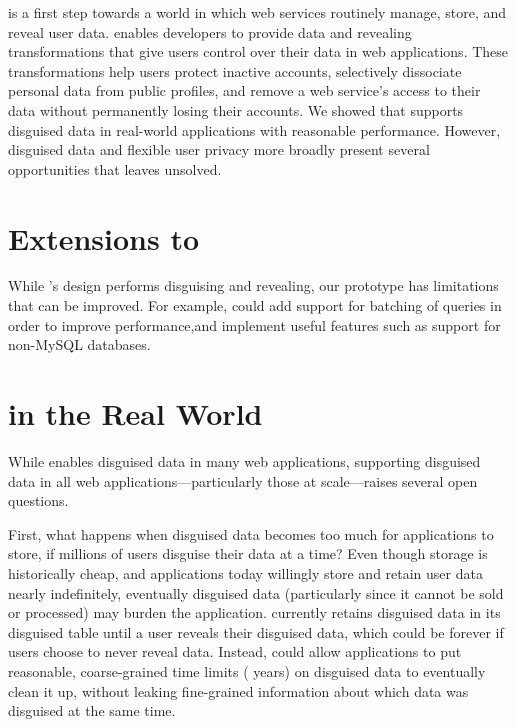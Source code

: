 %
\sys is a first step towards a world in which web services routinely manage,
store, and reveal \xxed user data.
%
\sys enables developers to provide data \xxing and revealing transformations
that give users control over their data in web applications.
%
These transformations help users protect inactive accounts, selectively
dissociate personal data from public profiles, and remove a web service's access
to their data without permanently losing their accounts.
%
We showed that \sys supports disguised data in real-world applications with
reasonable performance. However, disguised data and flexible user privacy more
broadly present several opportunities that \sys leaves unsolved.
%

\section{Extensions to \sys}
While \sys's design performs disguising and revealing, our \sys prototype has
limitations that can be improved.
%
For example, \sys could add support for batching of queries in order to improve
performance,and implement useful features such as support for non-MySQL
databases. 
%

\section{\sys in the Real World}

While \sys enables disguised data in many web applications, supporting disguised
data in all web applications---particularly those at scale---raises several
open questions. 

%
First, what happens when disguised data becomes too much for applications
to store, if \eg millions of users disguise their data at a time?  
%
Even though storage is historically cheap, and applications today willingly
store and retain user data nearly indefinitely, eventually disguised data
(particularly since it cannot be sold or processed) may burden the application.
%
\sys currently retains disguised data in its disguised table until a user reveals
their disguised data, which could be forever if users choose to never reveal
data.
%
Instead, \sys could allow applications to put reasonable, coarse-grained time
limits ( years) on disguised data to eventually clean it up, without
leaking fine-grained information about which data was disguised at the same
time.
%

